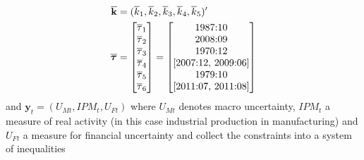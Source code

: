\documentclass[a4paper,11pt,listof=nochaptergap,oneside,pointednumbers,bibtotoc,bigheadings,liststotoc,hidelinks]{scrbook}
\theoremstyle{mysatz}
\theoremstyle{mydefinition}
\theoremstyle{mytheorem}
\theoremstyle{mybemerkung}
\newcommand{\vect}[1]{\boldsymbol{\mathbf{#1}}}
\begin{document}
\begin{equation}
\begin{split}
\overline{\vect{k}} & = (\overline{k}_1, \overline{k}_2, \overline{k}_3, \overline{k}_4, \overline{k}_5)'\\
\overline{\vect{\tau}} & = \begin{bmatrix}
			\overline{\tau}_1 \\
			\overline{\tau}_2 \\
			\overline{\tau}_3 \\
			\overline{\tau}_4 \\
			\overline{\tau}_5 \\
			\overline{\tau}_6
			\end{bmatrix} = 
			\begin{bmatrix}
			$1987:10$ \\
			$2008:09$ \\
			$1970:12$ \\
			$[2007:12, 2009:06]$ \\
			$1979:10$ \\
			$[2011:07, 2011:08]$
			\end{bmatrix}
\end{split}
\end{equation}
 and $\vect{y}_t = (U_{Mt}, IPM_{t}, U_{Ft})$ where $U_{Mt}$ denotes macro uncertainty, $IPM_{t}$ a measure of real activity (in this case industrial production in manufacturing) and $U_{Ft}$ a measure for financial uncertainty and collect the constraints into a system of inequalities
\end{document}
